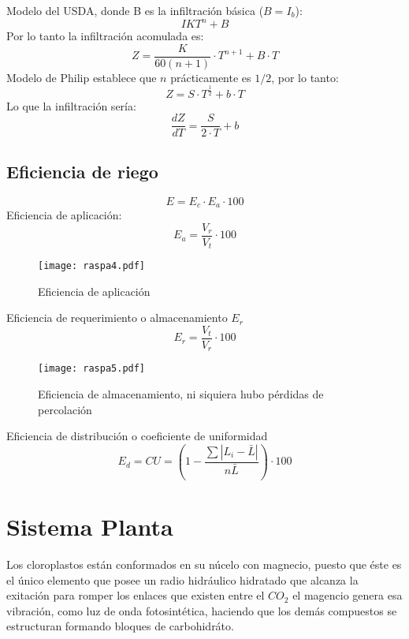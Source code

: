 Modelo del USDA, donde B es la infiltración básica ($B=I_b$):
\begin{equation}
    I KT^n + B
\end{equation}
Por lo tanto la infiltración acomulada es:
\begin{equation}
    Z =\frac{K}{60(n + 1)}\cdot T^{n + 1} + B\cdot T
\end{equation}
Modelo de Philip establece que $n$ prácticamente es $1/2$, por lo tanto:
\begin{equation}
    Z = S\cdot T^{\frac{1}{2}}+ b\cdot T
\end{equation}
Lo que la infiltración sería:
\begin{equation}
    \frac{dZ}{dT} =\frac{S}{2\cdot T} + b
\end{equation}
\subsection{Eficiencia de riego}
\begin{equation}
    E = E_c \cdot E_a \cdot 100
\end{equation}
Eficiencia de aplicación:
\begin{equation}
    E_a = \frac{V_r}{V_t} \cdot 100
\end{equation}
\begin{figure}[h!]
\centering
  \texttt{[image: raspa4.pdf]}
  \caption{Eficiencia de aplicación}
  \label{raspa4}
\end{figure}
Eficiencia de requerimiento o almacenamiento $E_r$
\begin{equation}
    E_r = \frac{V_t}{V_r} \cdot 100
\end{equation}
\begin{figure}[h!]
\centering
  \texttt{[image: raspa5.pdf]}
  \caption{Eficiencia de almacenamiento, ni siquiera hubo pérdidas de percolación}
  \label{raspa5}
\end{figure}
Eficiencia de distribución o coeficiente de uniformidad
\begin{equation}
    E_d = CU =\left(1 -\frac{\sum\left\lvert L_i -\bar{L}\right\rvert}{n\bar{L}}\right) \cdot 100
\end{equation}
\section{Sistema Planta}
Los cloroplastos están conformados en su núcelo con magnecio, puesto que éste es el único elemento que posee un radio hidráulico hidratado que alcanza la exitación para romper los enlaces que existen entre el $CO_2$ el magencio genera esa vibración, como luz de onda fotosintética, haciendo que los demás compuestos se estructuran formando bloques de carbohidráto.

